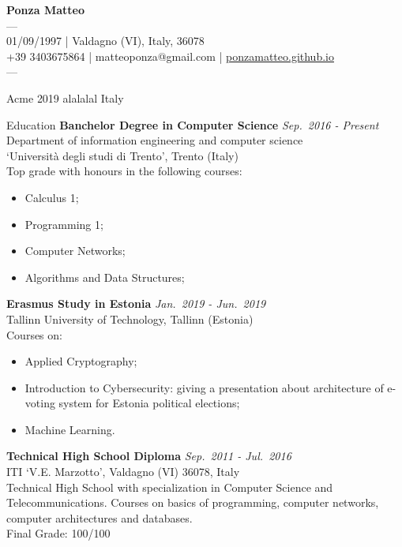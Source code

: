 \documentclass{resume} %
\begin{document}
    {\huge \bf Ponza Matteo}\\
    ---\\
    01/09/1997 | Valdagno (VI), Italy, 36078\\
    +39 3403675864 | matteoponza@gmail.com | \href{https://ponzamatteo.github.io/}{ponzamatteo.github.io}\\
    ---
    \hfill{}\\

    \begin{rSubsection}
        {Acme}
        {2019}
        {alalalal}
        {Italy}
    \end{rSubsection}

\begin{rSection}{Education}
{\bf Banchelor Degree in Computer Science} 
\hfill {\em Sep.~2016 - Present} 
\\ Department of information engineering and computer science
\\ `Università degli studi di Trento', Trento (Italy)
\\ Top grade with honours in the following courses:
\begin{itemize}
\item Calculus 1;
\item Programming 1;
\item Computer Networks;
\item Algorithms and Data Structures;
\end{itemize}


{\bf Erasmus Study in Estonia}
\hfill{\em Jan.~2019 - Jun.~2019} 
\\ Tallinn University of Technology, Tallinn (Estonia)
\\ Courses on:
\begin{itemize}
\item Applied Cryptography;
\item Introduction to Cybersecurity: giving a presentation about architecture of e-voting system for Estonia political elections;
\item Machine Learning.
\end{itemize}

{\bf Technical High School Diploma}
\hfill{\em Sep.~2011 - Jul.~2016} 
\\ ITI ‘V.E. Marzotto’, Valdagno (VI) 36078, Italy
\\ Technical High School with specialization in Computer Science and Telecommunications. Courses on basics of programming, computer networks, computer architectures and databases. 
\\ Final Grade: 100/100

\end{rSection}
\end{document}
